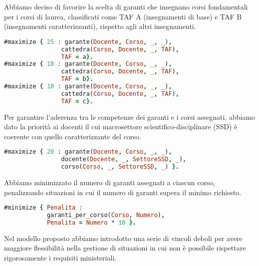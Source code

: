 Abbiamo deciso di favorire la scelta di garanti che insegnano corsi fondamentali per
i corsi di laurea, classificati come TAF A (insegnamenti di base) e TAF B
(insegnamenti caratterizzanti), rispetto agli altri insegnamenti.

\begin{lstlisting}[language=prolog, caption=TAF]
#maximize { 25 : garante(Docente, Corso, _, _), 
                cattedra(Corso, Docente, _, TAF), 
                TAF = a}.
#maximize { 18 : garante(Docente, Corso, _, _), 
                cattedra(Corso, Docente, _, TAF), 
                TAF = b}.
#maximize { 10 : garante(Docente, Corso, _, _), 
                cattedra(Corso, Docente, _, TAF), 
                TAF = c}.
\end{lstlisting}

Per garantire l’aderenza tra le competenze dei garanti e i corsi assegnati,
abbiamo dato la priorità ai docenti il cui macrosettore scientifico-disciplinare (SSD)
è coerente con quello caratterizzante del corso.

\begin{lstlisting}[language=prolog, caption=Garanti con macrosettore coerente a quello del corso.]
% Ottimizzare i garanti con SSD caratterizzante
#maximize { 20 : garante(Docente, Corso, _, _), 
                docente(Docente, _, SettoreSSD, _), 
                corso(Corso, _, SettoreSSD, _) }.
\end{lstlisting}

Abbiamo minimizzato il numero di garanti assegnati a ciascun corso, penalizzando
situazioni in cui il numero di garanti supera il minimo richiesto.

\begin{lstlisting}[language=prolog, caption=Minimizzazione dei garanti per corso di laurea.]
% Minimizzo il numero di garanti per ogni corso
#minimize { Penalita : 
            garanti_per_corso(Corso, Numero),
            Penalita = Numero * 10 }.
\end{lstlisting}

Nel modello proposto abbiamo introdotto una serie di vincoli deboli per avere
maggiore flessibilità nella gestione di situazioni in cui non è possibile rispettare
rigorosamente i requisiti ministeriali.


